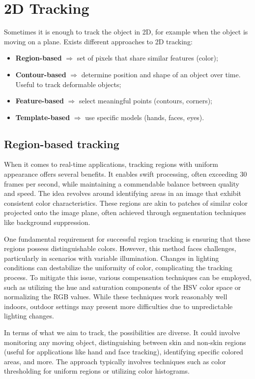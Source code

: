 \section{2D Tracking}
Sometimes it is enough to track the object in 2D, for example when the object is moving on a plane.
Exists different approaches to 2D tracking:
\begin{itemize}
\item \textbf{Region-based} $\Rightarrow$ set of pixels that share similar features (color);
\item \textbf{Contour-based} $\Rightarrow$ determine position and shape of an object over time. Useful to track deformable objects;
\item \textbf{Feature-based} $\Rightarrow$ select meaningful points (contours, corners);
\item \textbf{Template-based} $\Rightarrow$ use specific models (hands, faces, eyes).
\end{itemize}

\subsection{Region-based tracking}
When it comes to real-time applications, tracking regions with uniform appearance offers several benefits. 
It enables swift processing, often exceeding 30 frames per second, while maintaining a commendable balance between quality and speed. 
The idea revolves around identifying areas in an image that exhibit consistent color characteristics. 
These regions are akin to patches of similar color projected onto the image plane, often achieved through segmentation techniques like background suppression.

One fundamental requirement for successful region tracking is ensuring that these regions possess distinguishable colors. 
However, this method faces challenges, particularly in scenarios with variable illumination. 
Changes in lighting conditions can destabilize the uniformity of color, complicating the tracking process. 
To mitigate this issue, various compensation techniques can be employed, such as utilizing the hue and saturation components of the HSV color space or normalizing the RGB values. 
While these techniques work reasonably well indoors, outdoor settings may present more difficulties due to unpredictable lighting changes.

In terms of what we aim to track, the possibilities are diverse. 
It could involve monitoring any moving object, distinguishing between skin and non-skin regions (useful for applications like hand and face tracking), identifying specific colored areas, and more. 
The approach typically involves techniques such as color thresholding for uniform regions or utilizing color histograms.

